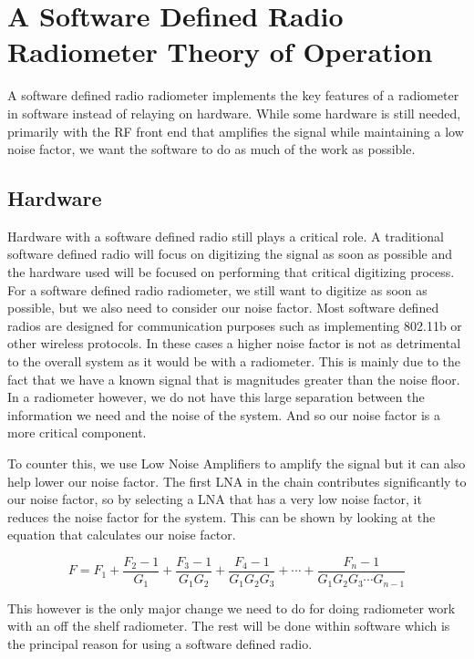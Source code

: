 \section{A Software Defined Radio Radiometer Theory of Operation}
A software defined radio radiometer implements the key features of a radiometer in software instead of relaying on hardware.  While some hardware is still needed, primarily with the RF front end that amplifies the signal while maintaining a low noise factor, we want the software to do as much of the work as possible.  

\subsection{Hardware}

Hardware with a software defined radio still plays a critical role.  A traditional software defined radio will focus on digitizing the signal as soon as possible and the hardware used will be focused on performing that critical digitizing process.  For a software defined radio radiometer, we still want to digitize as soon as possible, but we also need to consider our noise factor.  Most software defined radios are designed for communication purposes such as implementing 802.11b or other wireless protocols.  In these cases a higher noise factor is not as detrimental to the overall system as it would be with a radiometer.  This is mainly due to the fact that we have a known signal that is magnitudes greater than the noise floor.  In a radiometer however, we do not have this large separation between the information we need and the noise of the system.  And so our noise factor is a more critical component.  

To counter this, we use Low Noise Amplifiers to amplify the signal but it can also help lower our noise factor.  The first LNA in the chain contributes significantly to our noise factor, so by selecting a LNA that has a very low noise factor, it reduces the noise factor for the system.  This can be shown by looking at the equation that calculates our noise factor.

\begin{equation}\label{noise_factor}
F=F_1+\frac{F_2-1}{G_1}+\frac{F_3-1}{G_1 G_2}+\frac{F_4-1}{G_1 G_2 G_3}+\cdots +\frac{F_n-1}{G_1 G_2 G_3 \cdots G_{n-1}}
\end{equation}

This however is the only major change we need to do for doing radiometer work with an off the shelf radiometer.  The rest will be done within software which is the principal reason for using a software defined radio.  


